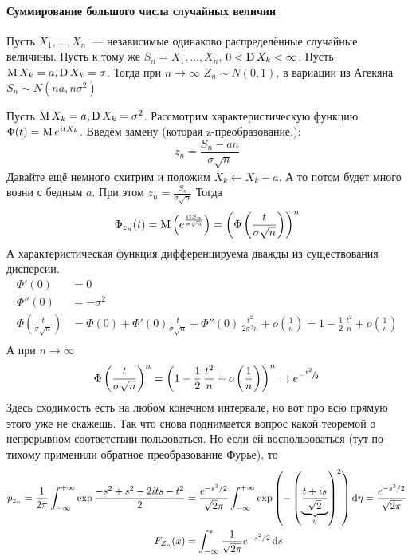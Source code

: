 \documentclass[12pt,timbord]{../../../notes}
\begin{document}
\paragraph{Суммирование большого числа случайных величин}
\label{par:stat::randlimsum}
\flame\underdev\sour

\begin{thrm}\label{thrm:stat::randlimsum::sum}
  Пусть $X_1, \dotsc, X_n$~--- независимые одинаково распределённые случайные величины. Пусть к
  тому же $S_n = X_1, \dotsc, X_n$, $0 < \operatorname{D} X_k < \infty$.
  Пусть $\operatorname{M} X_k = a, \operatorname{D} X_k = \sigma$. Тогда при $n\to \infty$ $Z_n \sim N(0,1)$,
  в вариации из Агекяна $S_n \sim N(na,n\sigma^2)$
\end{thrm}
\begin{ittproof}
  Пусть $\operatorname{M} X_k = a, \operatorname{D} X_k = \sigma^2$.
  Рассмотрим характеристическую функцию $\Phi(t) = \operatorname{M} e^{itX_k}$. Введём замену (которая
  z-преобразование.):
  \[
    z_n = \frac{S_n - a n}{\sigma \sqrt n}
  \]
  Давайте ещё немного схитрим и положим $X_k \gets X_k- a$. А то потом будет много возни с бедным
  $a$. При этом $z_n = \frac{S_n}{\sigma \sqrt n}$
  Тогда
  \[
    \Phi_{z_n} (t) = \operatorname{M} \left(e^{\frac{itS_n}{\sigma\sqrt n}} \right)=
    \left(\Phi\left(\frac{t}{\sigma \sqrt n} \right)\right)^n 
  \]
  А характеристическая функция дифференцируема дважды из существования дисперсии.
  \begin{align*}
    \Phi'(0) &= 0 \\
    \Phi''(0) &= - \sigma^2 \\
    \Phi\left(\frac{t}{\sigma \sqrt n} \right) 
    &= \Phi(0) + \Phi'(0) \frac{t}{\sigma \sqrt n} + \Phi''(0)\, \frac{t^2}{2\sigma^2 n} 
      + o\left(\frac{1}{n}\right)
    = 1  - \frac{1}{2}\,\frac{t^2}{n} +  o\left(\frac{1}{n}\right) \\
  \end{align*}
  А при $n\to \infty$ \[
    \Phi\left(\frac{t}{\sigma \sqrt n} \right)^n 
    = \left(1  - \frac{1}{2}\,\frac{t^2}{n} +  o\left(\frac{1}{n}\right)\right) ^n
    \rightrightarrows e^{-{}^{t^2}\!/_{\!2}}
  \]
  Здесь сходимость есть на любом конечном интервале, но вот про всю прямую этого уже не скажешь.
  Так что снова поднимается вопрос какой теоремой о непрерывном соответствии пользоваться.
  Но если ей воспользоваться (тут по-тихому применили обратное преобразование Фурье), то
  \begin{align*}
    p_{z_n}= \frac{1}{2\pi} \int_{-\infty}^{+\infty} \exp{\frac{- s^2 + s^2 - 2its - t^2}{2}}  &=
    \frac{e^{-s^2/2}}{\sqrt{2}\pi } 
    \int_{-\infty}^{+\infty} \exp\left(-\left(\underbrace{\frac{t+is}{\sqrt 2}}_\eta \right)^2\right) \mathrm{d} \eta 
    =\frac{e^{-s^2/2}}{\sqrt{2\pi} } \\
    F_{Z_n} (x) &= \int_{-\infty}^x \frac{1}{\sqrt{2\pi}} e^{-s^2/2} \, \mathrm{d} s 
  \end{align*}


\end{ittproof}
\end{document}
